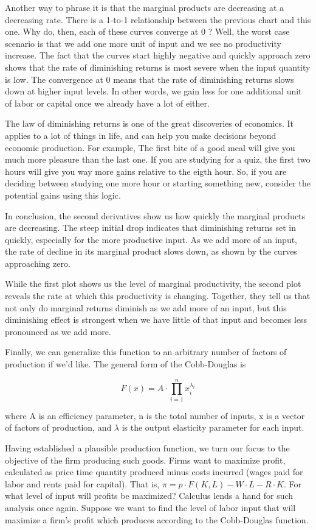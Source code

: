 \documentclass[10pt]{article}
\begin{document}
Another way to phrase it is that the marginal products are decreasing at a decreasing rate. There is a 1-to-1 relationship between the previous chart and this one. Why do, then, each of these curves converge at 0 ? Well, the worst case scenario is that we add one more unit of input and we see no productivity increase. The fact that the curves start highly negative and quickly approach zero shows that the rate of diminishing returns is most severe when the input quantity is low. The convergence at 0 means that the rate of diminishing returns slows down at higher input levels. In other words, we gain less for one additional unit of labor or capital once we already have a lot of either.

The law of diminishing returns is one of the great discoveries of economics. It applies to a lot of things in life, and can help you make decisions beyond economic production. For example, The first bite of a good meal will give you much more pleasure than the last one. If you are studying for a quiz, the first two hours will give you way more gains relative to the eigth hour. So, if you are deciding between studying one more hour or starting something new, consider the potential gains using this logic. 

In conclusion, the second derivatives show us how quickly the marginal products are decreasing. The steep initial drop indicates that diminishing returns set in quickly, especially for the more productive input. As we add more of an input, the rate of decline in its marginal product slows down, as shown by the curves approaching zero.

While the first plot shows us the level of marginal productivity, the second plot reveals the rate at which this productivity is changing. Together, they tell us that not only do marginal returns diminish as we add more of an input, but this diminishing effect is strongest when we have little of that input and becomes less pronounced as we add more.

Finally, we can generalize this function to an arbitrary number of factors of production if we'd like. The general form of the Cobb-Douglas is

$$F(x)=A \cdot \prod_{i=1}^{n} x_{i}^{\lambda_{i}}$$ 

where A is an efficiency parameter, n is the total number of inputs, x is a vector of factors of production, and $\lambda$ is the output elasticity parameter for each input.

Having established a plausible production function, we turn our focus to the objective of the firm producing such goods. Firms want to maximize profit, calculated as price time quantity produced minus costs incurred (wages paid for labor and rents paid for capital). That is, $\pi=p \cdot F(K, L) - W \cdot L - R \cdot K$. For what level of input will profits be maximized? Calculus lends a hand for such analysis once again. Suppose we want to find the level of labor input that will maximize a firm's profit which produces according to the Cobb-Douglas function.
\end{document}
